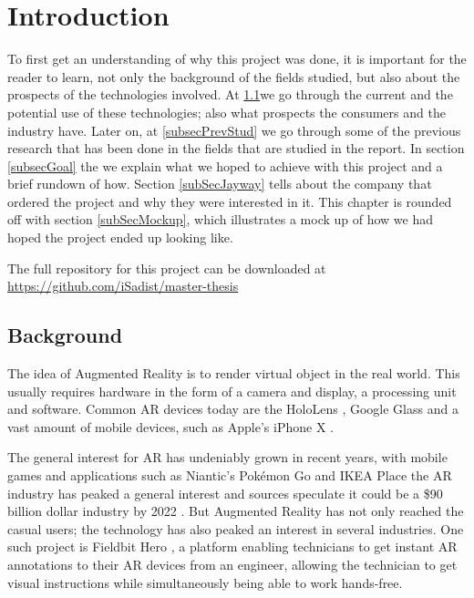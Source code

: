 \chapter{Introduction}
To first get an understanding of why this project was done, it is important for the reader to learn, not only the background of the fields studied, but also about the prospects of the technologies involved.
 At \ref{subsecBackground}we go through the current and the potential use of these technologies; also what prospects the consumers and the industry have. Later on, at  \ref{subsecPrevStud} we go through some of the previous research that has been done in the fields that are studied in the report. In section \ref{subsecGoal} the we explain what we hoped to achieve with this project and a brief rundown of how. Section \ref{subSecJayway} tells about the company that ordered the project and why they were interested in it. This chapter is rounded off with section \ref{subSecMockup}, which illustrates a mock up of how we had hoped the project ended up looking like.
 
 The full repository for this project can be downloaded at \url{https://github.com/iSadist/master-thesis}

\section{Background}
\label{subsecBackground}
The idea of Augmented Reality is to render virtual object in the real world. This usually 
requires hardware in the form of a camera and display, a processing unit and software. 
Common AR devices today are the HoloLens \cite{microsoft}, Google Glass 
\cite{googleGlasses} and a vast amount of mobile devices, such as Apple's iPhone X 
\cite{appleAR}. 

The general interest for AR has undeniably grown in recent years, with mobile games and 
applications such as Niantic's Pokémon Go \cite{pokemonGO} and IKEA Place 
\cite{IKEAPlace} the AR industry has peaked a general interest and sources speculate it 
could be a \$90 billion dollar industry by 2022 \cite{digi-capital}.
But Augmented Reality has not only reached the casual users; the technology has also 
peaked an interest in several industries. One such project is Fieldbit Hero 
\cite{fieldbit}, a platform enabling technicians to get instant AR annotations to their AR 
devices from an engineer, allowing the technician to get visual instructions while 
simultaneously  being able to work hands-free. 
 

